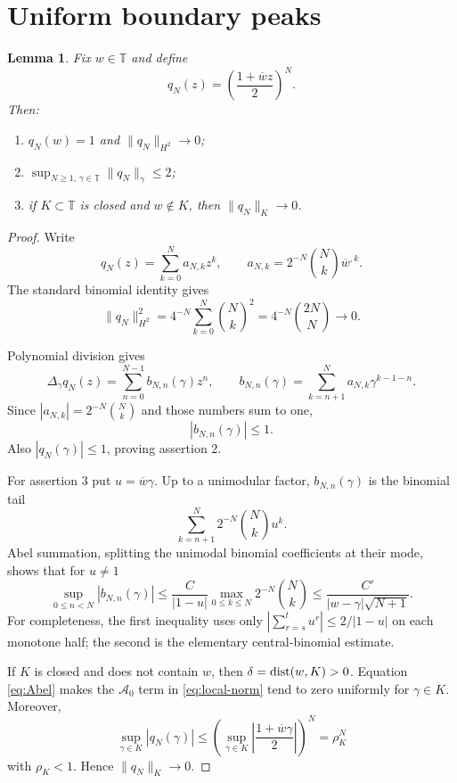 \documentclass[11pt]{article}
\newtheorem{lemma}[theorem]{Lemma}
\newcommand{\T}{\mathbb T}
\newcommand{\A}{\mathcal A_0}
\newcommand{\dd}{\mathop{\rm dist}}
\begin{document}
\section{Uniform boundary peaks}

\begin{lemma}\label{lem:peaks}
Fix $w\in\T$ and define
\[
 q_N(z)=\left(\frac{1+\overline wz}{2}\right)^N.
 \tag{10}\label{eq:peak}
\]
Then:
\begin{enumerate}
\item $q_N(w)=1$ and $\|q_N\|_{H^2}\to0$;
\item $\sup_{N\ge1,\,\gamma\in\T}\|q_N\|_\gamma\le2$;
\item if $K\subset\T$ is closed and $w\notin K$, then
      $\|q_N\|_K\to0$.
\end{enumerate}
\end{lemma}

\begin{proof}
Write
\[
 q_N(z)=\sum_{k=0}^{N}a_{N,k}z^k,
 \qquad
 a_{N,k}=2^{-N}\binom Nk\overline w^{,k}.
\]
The standard binomial identity gives
\[
 \|q_N\|_{H^2}^2
 =4^{-N}\sum_{k=0}^{N}\binom Nk^2
 =4^{-N}\binom{2N}{N}\longrightarrow0.
 \tag{11}\label{eq:H2-peak}
\]

Polynomial division gives
\[
 \Delta_\gamma q_N(z)=\sum_{n=0}^{N-1}b_{N,n}(\gamma)z^n,
 \qquad
 b_{N,n}(\gamma)
 =\sum_{k=n+1}^{N}a_{N,k}\gamma^{k-1-n}.
 \tag{12}\label{eq:division}
\]
Since $|a_{N,k}|=2^{-N}\binom Nk$ and those numbers sum to one,
\[
 |b_{N,n}(\gamma)|\le1.
 \tag{13}\label{eq:uniform-bound}
\]
Also $|q_N(\gamma)|\le1$, proving assertion 2.

For assertion 3 put $u=\overline w\gamma$.  Up to a unimodular factor,
$b_{N,n}(\gamma)$ is the binomial tail
\[
 \sum_{k=n+1}^{N}2^{-N}\binom Nk u^k.
 \tag{14}\label{eq:tail}
\]
Abel summation, splitting the unimodal binomial coefficients at their mode,
shows that for $u\ne1$
\[
 \sup_{0\le n<N}|b_{N,n}(\gamma)|
 \le \frac{C}{|1-u|}
       \max_{0\le k\le N}2^{-N}\binom Nk
 \le \frac{C'}{|w-\gamma|\sqrt{N+1}}.
 \tag{15}\label{eq:Abel}
\]
For completeness, the first inequality uses only
$|\sum_{r=s}^{t}u^r|\le2/|1-u|$ on each monotone half; the second is the
elementary central-binomial estimate.

If $K$ is closed and does not contain $w$, then
$\delta=\dd(w,K)>0$.  Equation \eqref{eq:Abel} makes the $\A$ term in
\eqref{eq:local-norm} tend to zero uniformly for $\gamma\in K$.  Moreover,
\[
 \sup_{\gamma\in K}|q_N(\gamma)|
 \le \left(\sup_{\gamma\in K}
       \left|\frac{1+\overline w\gamma}{2}\right|\right)^N
 =\rho_K^N
\]
with $\rho_K<1$.  Hence $\|q_N\|_K\to0$.
\end{proof}
\end{document}
